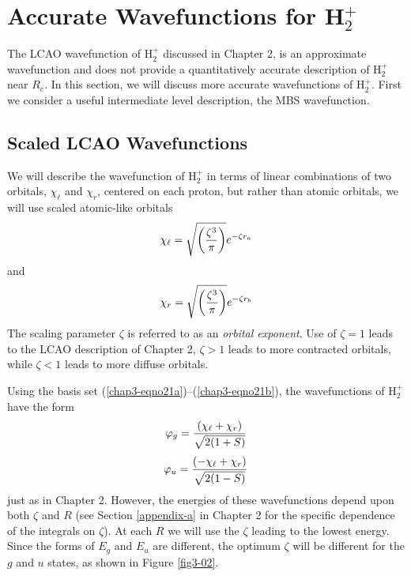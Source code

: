 \section{Accurate Wavefunctions for H$^+_2$}

The LCAO wavefunction of H$^+_2$ discussed in Chapter 2, is an
approximate wavefunction and does not provide a quantitatively
accurate description of H$^+_2$ near $R_e$.  In this section, we will
discuss more accurate wavefunctions of H$^+_2$. First we consider a
useful intermediate level description, the MBS wavefunction.


\subsection{Scaled LCAO Wavefunctions}

We will describe the wavefunction of H$^+_2$ in terms of linear combinations
of two orbitals, $\chi_\ell$ and $\chi_r$, centered on each proton, but rather 
than atomic orbitals, we will use scaled atomic-like orbitals
\begin{equation}
\chi_\ell = \sqrt{\left( {\zeta^3 \over \pi} \right)} e^{- \zeta 
r_a}
\label{chap3-eqno21a}
\end{equation}
and
\begin{equation}
\chi_r = \sqrt{\left( {\zeta^3 \over \pi} \right)} e^{- \zeta 
r_b}
\label{chap3-eqno21b}
\end{equation}
The scaling parameter $\zeta$ is referred to as an \emph{orbital
exponent}.  Use of $\zeta = 1$ leads to the LCAO description of
Chapter 2, $\zeta > 1$ leads to more contracted orbitals, while $\zeta
< 1$ leads to more diffuse orbitals.

Using the basis set (\ref{chap3-eqno21a})--(\ref{chap3-eqno21b}), the
wavefunctions of H$^+_2$ have the form
\begin{equation}
\varphi_g = {( \chi_\ell + \chi_r) \over \sqrt{2(1+S)}}
\end{equation}
\begin{equation}
\varphi_u = {( - \chi_\ell + \chi_r) \over \sqrt{2(1-S)}}
\end{equation}
just as in Chapter 2.  However, the energies of these wavefunctions
depend upon both $\zeta$ and $R$ (see Section \ref{appendix-a} in
Chapter 2 for the specific dependence of the integrals on $\zeta$).
At each $R$ we will use the $\zeta$ leading to the lowest energy.
Since the forms of $E_g$ and $E_u$ are different, the optimum $\zeta$
will be different for the $g$ and $u$ states, as shown in Figure
\ref{fig3-02}.

